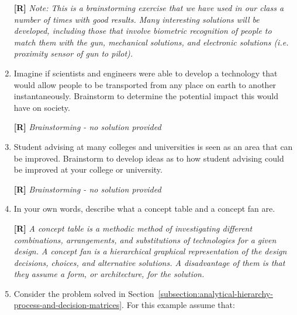 \begin{enumerate}
  \begin{onlysolution}
    \textbf{[R]}
    \itshape
    \emph{Note:} This is a brainstorming exercise that we have used in 
    our class a number of times with good results. Many interesting solutions 
    will be developed, including those that involve biometric recognition of 
    people to match them with the gun, mechanical solutions, and electronic 
    solutions (i.e. proximity sensor of gun to pilot).
  \end{onlysolution}

\item
  Imagine if scientists and engineers were able to develop a technology
  that would allow people to be transported from any place on earth to
  another instantaneously. Brainstorm to determine the potential impact
  this would have on society.

  \begin{onlysolution}
    \textbf{[R]}
    \itshape
    Brainstorming - no solution provided
  \end{onlysolution}

\item
  Student advising at many colleges and universities is seen as an area
  that can be im­proved. Brainstorm to develop ideas as to how student
  advising could be improved at your college or university.

  \begin{onlysolution}
    \textbf{[R]}
    \itshape
    Brainstorming - no solution provided
  \end{onlysolution}

\item
  In your own words, describe what a concept table and a concept fan
  are.

  \begin{onlysolution}
    \textbf{[R]}
    \itshape
    A concept table is a methodic method of investigating different 
    combinations, arrangements, and substitutions of technologies for a 
    given design. A concept fan is a hierarchical graphical representation 
    of the design decisions, choices, and alternative solutions. A 
    disadvantage of them is that they assume a form, or architecture, 
    for the solution.
  \end{onlysolution}

\item
  Consider the problem solved in 
  Section~\ref{subsection:analytical-hierarchy-process-and-decision-matrices}. 
  For this example assume   that:
\begin{itemize}


\end{itemize}
\end{enumerate}
